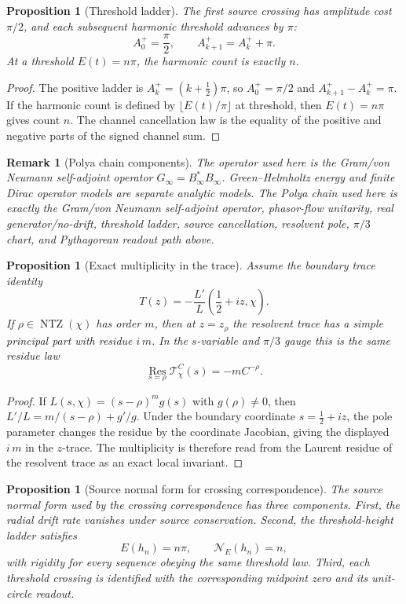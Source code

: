 \documentclass[11pt]{article}
\newtheorem{proposition}[definition]{Proposition}
\newtheorem{remark}[definition]{Remark}
\DeclareMathOperator{\NTZ}{NTZ}
\begin{document}
\begin{proposition}[Threshold ladder]
The first source crossing has amplitude cost $\pi/2$, and each subsequent
harmonic threshold advances by $\pi$:
\[
  A_0^+=\frac{\pi}{2},
  \qquad
  A_{k+1}^+=A_k^++\pi .
\]
At a threshold $E(t)=n\pi$, the harmonic count is exactly $n$.
\end{proposition}

\begin{proof}
The positive ladder is $A_k^+=(k+\frac12)\pi$, so
$A_0^+=\pi/2$ and $A_{k+1}^+-A_k^+=\pi$.  If the harmonic count is defined by
$\lfloor E(t)/\pi\rfloor$ at threshold, then $E(t)=n\pi$ gives count $n$.
The channel cancellation law is the equality of the positive and negative
parts of the signed channel sum.
\end{proof}

\begin{remark}[Polya chain components]
The operator used here is the Gram/von Neumann self-adjoint operator
$G_\infty=B_\infty^*B_\infty$.  Green--Helmholtz energy and finite Dirac
operator models are separate analytic models.  The Polya chain used here is
exactly the Gram/von Neumann
self-adjoint operator, phasor-flow unitarity, real generator/no-drift,
threshold ladder, source cancellation, resolvent pole, $\pi/3$ chart, and
Pythagorean readout path above.
\end{remark}

\begin{proposition}[Exact multiplicity in the trace]
Assume the boundary trace identity
\[
  T(z)=
  -\frac{L'}{L}\!\left(\frac12+iz,\chi\right).
\]
If $\rho\in\NTZ(\chi)$ has order $m$, then at
$z=z_\rho$ the resolvent trace has a simple principal
part with residue $i\,m$.  In the $s$-variable and $\pi/3$ gauge this is the
same residue law
\[
  \operatorname*{Res}_{s=\rho}\mathcal T_\chi^C(s)=-mC^{-\rho}.
\]
\end{proposition}

\begin{proof}
If $L(s,\chi)=(s-\rho)^m g(s)$ with $g(\rho)\ne0$, then
$L'/L=m/(s-\rho)+g'/g$.  Under the boundary coordinate
$s=\frac12+iz$, the pole parameter changes the residue by the coordinate
Jacobian, giving the displayed $i\,m$ in the $z$-trace.  The multiplicity is
therefore read from the Laurent residue of the resolvent trace as an exact
local invariant.
\end{proof}

\begin{proposition}[Source normal form for crossing correspondence]
The source normal form used by the crossing correspondence has three
components.  First, the radial drift rate vanishes under source conservation.
Second, the threshold-height ladder satisfies
\[
  E(h_n)=n\pi,\qquad
  \mathcal N_{E}(h_n)=n,
\]
with rigidity for every sequence obeying the same threshold law.  Third, each
threshold crossing is identified with the corresponding midpoint zero and its
unit-circle readout.
\end{proposition}
\end{document}
